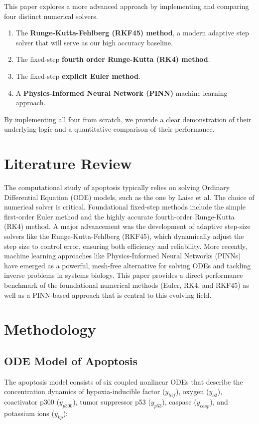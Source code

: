 \documentclass[conference]{IEEEtran}
\begin{document}
This paper explores a more advanced approach by implementing and comparing four distinct numerical solvers.
\begin{enumerate}
    \item The \textbf{Runge-Kutta-Fehlberg (RKF45) method}, a modern adaptive step solver that will serve as our high accuracy baseline.
    \item The fixed-step \textbf{ fourth order Runge-Kutta (RK4) method}.
    \item The fixed-step \textbf{ explicit Euler method}.
    \item A \textbf{Physics-Informed Neural Network (PINN)} machine learning approach.
\end{enumerate}
By implementing all four from scratch, we provide a clear demonstration of their underlying logic and a quantitative comparison of their performance.

\section{Literature Review}
The computational study of apoptosis typically relies on solving Ordinary Differential Equation (ODE) models, such as the one by Laise et al. The choice of numerical solver is critical. Foundational fixed-step methods include the simple first-order Euler method and the highly accurate fourth-order Runge-Kutta (RK4) method. A major advancement was the development of adaptive step-size solvers like the Runge-Kutta-Fehlberg (RKF45), which dynamically adjust the step size to control error, ensuring both efficiency and reliability. More recently, machine learning approaches like Physics-Informed Neural Networks (PINNs) have emerged as a powerful, mesh-free alternative for solving ODEs and tackling inverse problems in systems biology. This paper provides a direct performance benchmark of the foundational numerical methods (Euler, RK4, and RKF45) as well as a PINN-based approach that is central to this evolving field.

\section{Methodology}
\subsection{ODE Model of Apoptosis}
The apoptosis model consists of six coupled nonlinear ODEs that describe the concentration dynamics of hypoxia-inducible factor ($y_{hif}$), oxygen ($y_{o2}$), coactivator p300 ($y_{p300}$), tumor suppressor p53 ($y_{p53}$), caspase ($y_{casp}$), and potassium ions ($y_{kp}$):
\end{document}
